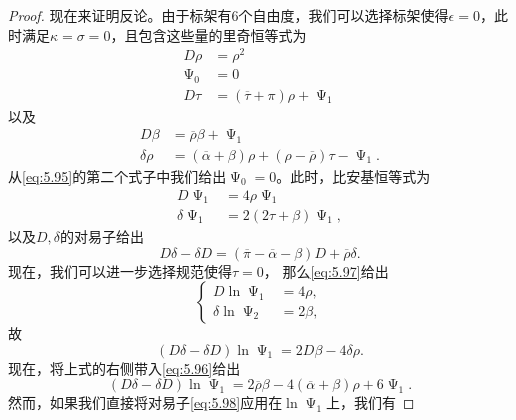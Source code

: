 \begin{proof}
	现在来证明反论。由于标架有$6$个自由度，我们可以选择标架使得$\epsilon =0$，此时满足$\kappa =\sigma =0$，且包含这些量的里奇恒等式为
	\begin{equation}
		\begin{aligned}
			D\rho  & =\rho ^{2}\\
			\upPsi _{0} & =0\\
			D\tau  & =(\overline{\tau } +\pi )\rho +\upPsi _{1}
		\end{aligned}
		\label{eq:5.95}
	\end{equation}
	以及
	\begin{equation}
		\begin{aligned}
			D\beta  & =\overline{\rho } \beta +\upPsi _{1}\\
			\delta \rho  & =(\overline{\alpha } +\beta )\rho +(\rho -\overline{\rho } )\tau -\upPsi _{1} .
		\end{aligned}
		\label{eq:5.96}
	\end{equation}
	从\ref{eq:5.95}的第二个式子中我们给出$\upPsi _{0} =0$。此时，比安基恒等式为
	\begin{equation}
		\begin{aligned}
			D\upPsi _{1} & =4\rho \upPsi _{1}\\
			\delta \upPsi _{1} & =2(2\tau +\beta )\upPsi _{1} ,
		\end{aligned}
		\label{eq:5.97}
	\end{equation}
	以及$D,\delta $的对易子给出
	\begin{equation}
		D\delta -\delta D=(\overline{\pi } -\overline{\alpha } -\beta )D+\overline{\rho } \delta .
		\label{eq:5.98}
	\end{equation}
	现在，我们可以进一步选择规范使得$\tau =0$， 那么\ref{eq:5.97}给出
	\begin{equation*}
		\begin{cases}
			D\ln \upPsi _{1} & =4\rho ,\\
			\delta \ln \upPsi _{2} & =2\beta ,
		\end{cases}
	\end{equation*}
	故
	\begin{equation*}
		(D\delta -\delta D)\ln \upPsi _{1} =2D\beta -4\delta \rho .
	\end{equation*}
	现在，将上式的右侧带入\ref{eq:5.96}给出
	\begin{equation}
		(D\delta -\delta D)\ln \upPsi _{1} =2\overline{\rho } \beta -4(\overline{\alpha } +\beta )\rho +6\upPsi _{1} .
		\label{eq:5.99}
	\end{equation}
	然而，如果我们直接将对易子\ref{eq:5.98}应用在$\ln \upPsi _{1}$上，我们有

\end{proof}
